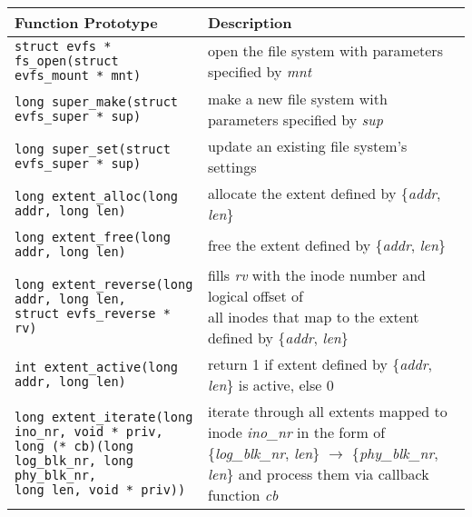 \begin{table*}
\begin{centering}
\begin{small}
\begin{tabular}[t]{|l|l|}
\hline 
Function Prototype & Description \\
\hline
\hline
\texttt{struct evfs * fs\_open(struct evfs\_mount * mnt)} & open the file system with parameters specified by \textit{mnt} \\
\hline
\hline
\texttt{long super\_make(struct evfs\_super * sup)} & make a new file system with parameters specified by \textit{sup} \\
\hline
\texttt{long super\_set(struct evfs\_super * sup)} & update an existing file system's settings \\
\hline
\hline 
\texttt{long extent\_alloc(long addr, long len)} & allocate the extent defined by \{\textit{addr}, \textit{len}\} \\
\hline 
\texttt{long extent\_free(long addr, long len)} & free the extent defined by \{\textit{addr}, \textit{len}\} \\
\hline 
\makecell[l]{\texttt{long extent\_reverse(long addr, long len,} \\
\hspace{1em}\texttt{struct evfs\_reverse * rv)}} & \makecell[l]{fills \textit{rv} with the inode number and logical offset of \\ all inodes that map to the extent defined by \{\textit{addr}, \textit{len}\}} \\
\hline 
\texttt{int extent\_active(long addr, long len)} & return 1 if extent defined by \{\textit{addr}, \textit{len}\} is active, else 0 \\
\hline 
\makecell[l]{\texttt{long extent\_iterate(long ino\_nr, void * priv,} \\ 
\hspace{1em}\texttt{long (* cb)(long log\_blk\_nr, long phy\_blk\_nr,} \\
\hspace{7.25em}\texttt{long len, void * priv))}} & \makecell[l]{iterate through all extents mapped to inode \textit{ino\_nr} in \\ the form of \{\textit{log\_blk\_nr}, \textit{len}\} $\rightarrow$ \{\textit{phy\_blk\_nr}, \textit{len}\} \\ and process them via callback function \textit{cb}} \\

\end{tabular}
\end{small}
\end{centering}
\end{table*}

